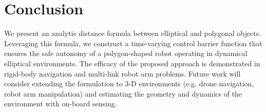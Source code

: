 \section{Conclusion}

We present an analytic distance formula between elliptical and polygonal objects.  Leveraging this formula, we construct a time-varying control barrier function that ensures the safe autonomy of a polygon-shaped robot operating in dynamical elliptical environments. The efficacy of the proposed approach is demonstrated in rigid-body navigation and multi-link robot arm problems. 
Future work will consider extending the formulation to 3-D environments (e.g. drone navigation, robot arm manipulation) and estimating the geometry and dynamics of the environment with on-board sensing. 

